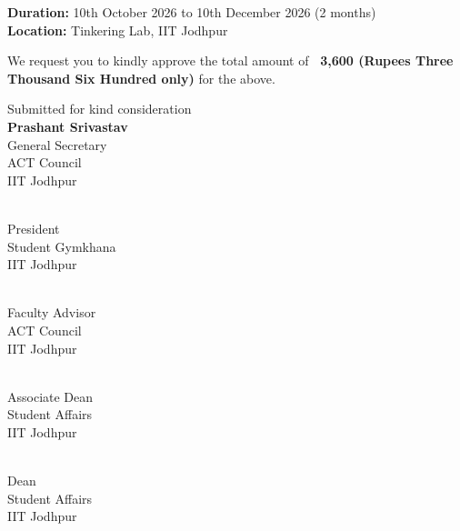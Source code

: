 \documentclass[11pt,letterpaper]{article}
\newcommand{\rs}{{\rupee}}
\newcommand{\GSname}{Prashant Srivastav}
\newcommand{\PresName}{Rudra Gupta}
\newcommand{\FAname}{Dr. Hardik Jain}
\newcommand{\ADname}{Dr. Pranay Ranjan}
\newcommand{\Deanname}{Dr. Rajlaxmi Chouhan}
\newcommand{\signature}[3]{%
  \begin{minipage}[t]{0.45\textwidth}\raggedright
  \vspace{1.2cm}{\bfseries #1}\\ #2\\ #3\\ IIT Jodhpur\end{minipage}}
\begin{document}
{\bfseries Duration:} 10th October 2026 to 10th December 2026 (2 months)\\
{\bfseries Location:} Tinkering Lab, IIT Jodhpur

We request you to kindly approve the total amount of {\bfseries \rs~3,600 (Rupees Three Thousand Six Hundred only)} for the above.

\clearpage
\begin{flushright}
  {\small Submitted for kind consideration}\\[1.2cm]
  {\large\bfseries \GSname}\\
  General Secretary\\
  ACT Council\\
  IIT Jodhpur
\end{flushright}

\noindent\signature{\PresName}{President}{Student Gymkhana}\par
\noindent\signature{\FAname}{Faculty Advisor}{ACT Council}\par
\noindent\signature{\ADname}{Associate Dean}{Student Affairs}\par
\noindent\signature{\Deanname}{Dean}{Student Affairs}
\end{document}
